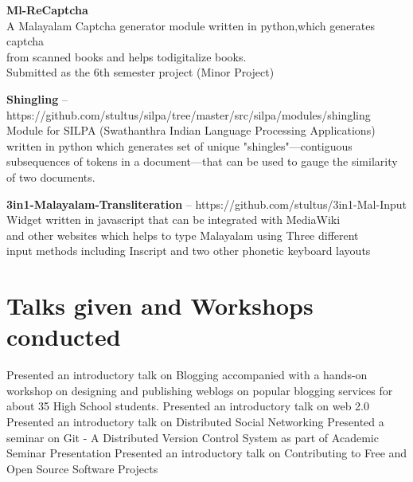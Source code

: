 \documentclass[11pt,a4paper]{moderncv}
\begin{document}
\cvlistitem
{\textbf{Ml-ReCaptcha}  
  \\A Malayalam Captcha generator module written in python,which generates captcha\\
    from scanned books and helps todigitalize books.\\
    Submitted as the 6th semester project (Minor Project) \\
}

\cvlistitem
{\textbf{Shingling} -- {\small https://github.com/stultus/silpa/tree/master/src/silpa/modules/shingling}
  \\Module for SILPA (Swathanthra Indian Language Processing Applications)\\
    written in python which generates set of unique "shingles"—contiguous  \\
    subsequences of tokens in a document—that can be used to gauge the similarity of two documents.\\
}

\cvlistitem
{\textbf{3in1-Malayalam-Transliteration} -- {\small https://github.com/stultus/3in1-Mal-Input}
  \\Widget written in javascript that can be integrated with MediaWiki \\
    and other websites which helps to type Malayalam using Three different\\
    input methods including Inscript and two other phonetic keyboard layouts
}





\section{Talks given and Workshops conducted}
{Presented an introductory talk on Blogging accompanied with a hands-on workshop on designing and  publishing weblogs on popular blogging services for about 35 High School students.}
{Presented an introductory talk on web 2.0} 
{Presented an introductory talk on Distributed Social Networking} 
{Presented a seminar on Git - A Distributed Version Control System as part of Academic Seminar Presentation}
{Presented an introductory talk on Contributing to Free and Open Source Software Projects}  
\end{document}
